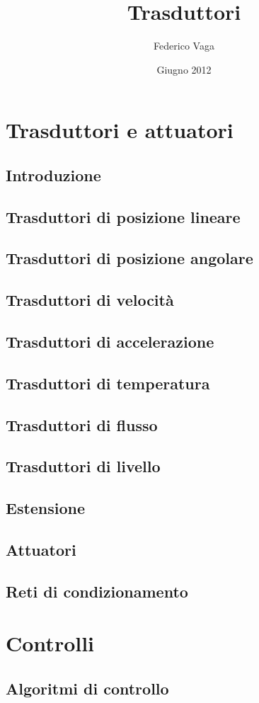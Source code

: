 \documentclass[a4paper,10pt]{book}
\title{Trasduttori}
\author{Federico Vaga}
\date{Giugno 2012}
\begin{document}
\maketitle

\makeindex

\tableofcontents
\listoffigures

\part{Trasduttori e attuatori}
\chapter{Introduzione}

\chapter{Trasduttori di posizione lineare}

\chapter{Trasduttori di posizione angolare}

\chapter{Trasduttori di velocità}

\chapter{Trasduttori di accelerazione}

\chapter{Trasduttori di temperatura}

\chapter{Trasduttori di flusso}

\chapter{Trasduttori di livello}

\chapter{Estensione}

\chapter{Attuatori}

\chapter{Reti di condizionamento}

\part{Controlli}
\chapter{Algoritmi di controllo}

\end{document}
